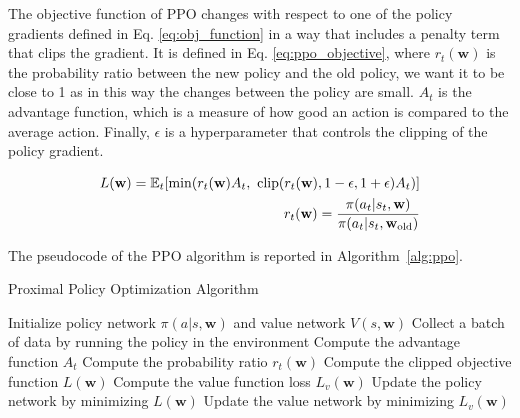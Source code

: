 The objective function of PPO changes with respect to one of the policy gradients defined in Eq. \ref{eq:obj_function} in a way that includes a penalty term that clips the gradient.
It is defined in Eq. \ref{eq:ppo_objective}, where $r_t(\textbf{w})$ is the probability ratio between the new policy and the old policy, we want it to be close to 1 as in this way the changes between the policy are small. 
$A_t$ is the advantage function, which is a measure of how good an action is compared to the average action.
Finally, $\epsilon$ is a hyperparameter that controls the clipping of the policy gradient.

\begin{equation} \label{eq:ppo_objective}
\begin{split}
    L(\textbf{w}) = \E_t [\min( r_t(\textbf{w})A_t, \ \text{clip}(r_t(\textbf{w}), 1-\epsilon, 1+\epsilon)A_t)] \\
    r_t(\textbf{w}) = \frac{\pi(a_t|s_t, \textbf{w})}{\pi(a_t|s_t, \textbf{w}_{\text{old}})}
\end{split}
\end{equation}

The pseudocode of the PPO algorithm is reported in Algorithm~\ref{alg:ppo}.



\begin{algorithm}
\caption{Proximal Policy Optimization Algorithm}\label{alg:ppo}
\begin{algorithmic}
\State Initialize policy network $\pi(a|s, \textbf{w})$ and value network $V(s, \textbf{w})$
        \State Collect a batch of data by running the policy in the environment
        \State Compute the advantage function $A_t$
        \State Compute the probability ratio $r_t(\textbf{w})$
        \State Compute the clipped objective function $L(\textbf{w})$
        \State Compute the value function loss $L_v(\textbf{w})$
        \State Update the policy network by minimizing $L(\textbf{w})$
        \State Update the value network by minimizing $L_v(\textbf{w})$
    \EndFor
\EndFor
\end{algorithmic}
\end{algorithm}

